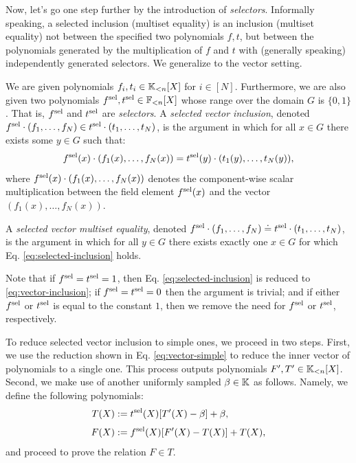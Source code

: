 Now, let's go one step further by the introduction of \textit{selectors}. Informally speaking, a selected inclusion (multiset equality) is an inclusion (multiset equality) not between the specified two polynomials $f,t$, but between the polynomials generated by the multiplication of $f$ and $t$ with (generally speaking) independently generated selectors. We generalize to the vector setting.
\begin{definition}\label{def:sel-args}
  We are given polynomials $f_i,t_i \in \mathbb{K}_{<n}[X]$ for $i\in[N]$. Furthermore, we are also given two polynomials $f^{\text{sel}},t^{\text{sel}} \in \mathbb{F}_{<n}[X]$ whose range over the domain $G$ is $\{0,1\}$. That is, $f^{\text{sel}}$ and $t^{\text{sel}}$ are \textit{selectors}. A \textit{selected vector inclusion}, denoted $f^{\text{sel}} \cdot (f_1,\dots,f_N) \in t^{\text{sel}} \cdot (t_1,\dots,t_N)$, is the argument in which for all $x \in G$ there exists some $y \in G$ such that:
  \begin{equation}\label{eq:selected-inclusion}
    f^{\text{sel}}(x) \cdot  (f_1(x),\dots,f_N(x)) = t^{\text{sel}}(y) \cdot (t_1(y),\dots,t_N(y)),
  \end{equation}
  where $f^{\text{sel}}(x) \cdot  (f_1(x),\dots,f_N(x))$ denotes the component-wise scalar multiplication between the field element $f^{\text{sel}}(x)$ and the vector $(f_1(x),\dots,f_N(x))$.

  A \textit{selected vector multiset equality}, denoted $f^{\text{sel}} \cdot (f_1,\dots,f_N) \doteq t^{\text{sel}} \cdot (t_1,\dots,t_N)$, is the argument in which for all $y \in G$ there exists exactly one $x \in G$ for which Eq. \eqref{eq:selected-inclusion} holds.
\end{definition}

\begin{bremark}
Note that if $f^{\text{sel}} = t^{\text{sel}} = 1$, then Eq. \eqref{eq:selected-inclusion} is reduced to \eqref{eq:vector-inclusion}; if $f^{\text{sel}} = t^{\text{sel}} = 0$ then the argument is trivial; and if either $f^{\text{sel}}$ or $t^{\text{sel}}$ is equal to the constant $1$, then we remove the need for $f^{\text{sel}}$ or $t^{\text{sel}}$, respectively.
\end{bremark}

To reduce selected vector inclusion to simple ones, we proceed in two steps. First, we use the reduction shown in Eq. \eqref{eq:vector-simple} to reduce the inner vector of polynomials to a single one. This process outputs polynomials $F',T' \in \mathbb{K}_{<n}[X]$. Second, we make use of another uniformly sampled $\beta \in \mathbb{K}$ as follows. Namely, we define the following polynomials:
\begin{align}\label{eq:F-T-sel}
\begin{split}
T(X) &:= t^{\text{sel}}(X) [T'(X) - \beta] + \beta, \\[0.1cm]
F(X) &:= f^{\text{sel}}(X) [F'(X) - T(X)] + T(X),
\end{split}
\end{align}
and proceed to prove the relation $F \in T$. 

